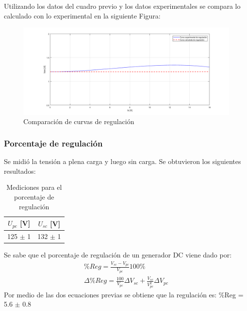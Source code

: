 \documentclass[11pt,letterpaper]{article}     %
\begin{document}
Utilizando los datos del cuadro previo y los datos experimentales se compara lo calculado con lo experimental en la siguiente Figura:
\begin{figure}[H]
	\centering
	\includegraphics[scale=0.5]{./recursos-Lab6/curvaCaractRegulacionComparacion.png}
	\caption{Comparación de curvas de regulación}
	\label{fig:curvaDeRegComparacion}
\end{figure}
\subsubsection{Porcentaje de regulación}
Se midió la tensión a plena carga y luego sin carga. Se obtuvieron los siguientes resultados:
\begin{table}[H]
	\centering
	\caption{Mediciones para el porcentaje de regulación}
	\label{MedPReg}
	\begin{tabular}{|c|c|}
		\hline
		\textbf{$U_{pc}$ {[}V{]}} & \textbf{$U_{sc}$ {[}V{]}} \\ \hline
		125 $\pm$ 1               & 132 $\pm$ 1               \\ \hline
	\end{tabular}
\end{table}
Se sabe que el porcentaje de regulación de un generador DC viene dado por:
\begin{align}
	\%Reg = \frac{V_{sc}-V_{pc}}{V_{pc}}100\%\\
	\Delta \%Reg = \frac{100}{V_{pc}}\Delta V_{sc} + \frac{V_{sc}}{V_ {pc}^{2}}\Delta V_{pc}
\end{align}
Por medio de las dos ecuaciones previas se obtiene que la regulación es: \%Reg = 5.6 $\pm$ 0.8
\end{document}
